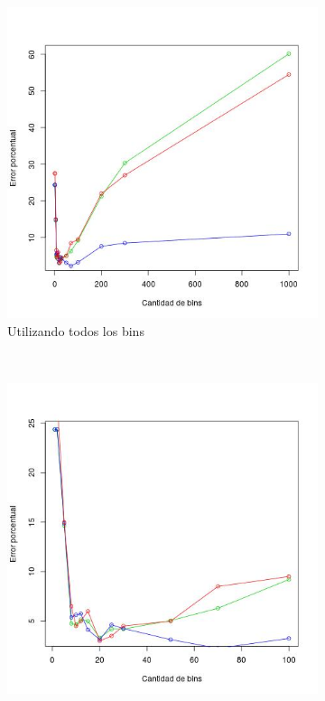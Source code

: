 \documentclass[12pt, a4paper]{article}
\begin{document}
\begin{figure}
    \centering

    \begin{subfigure}[b]{0.45\textwidth}
        \includegraphics[width=\textwidth]{errorde}
        \caption{Utilizando todos los bins}
    \end{subfigure}
      ~ %
    \begin{subfigure}[b]{0.45\textwidth}
        \includegraphics[width=\textwidth]{errorde2}

\end{subfigure}
\end{figure}
\end{document}
